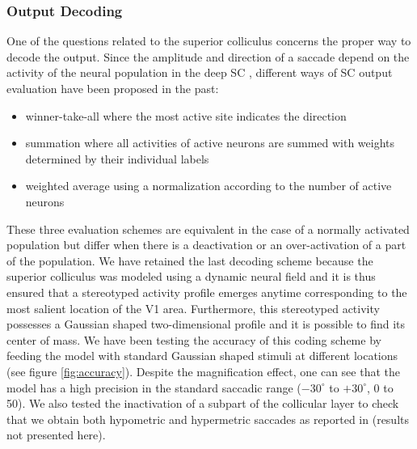 \subsubsection{Output Decoding}
One of the questions related to the superior colliculus concerns the proper way
to decode the output. Since the amplitude and direction of a saccade depend on
the activity of the neural population in the deep SC \cite {Sparks:1990},
different ways of SC output evaluation have been proposed in the past:
\begin{itemize}
\item winner-take-all where the most active site indicates the direction
\item summation\cite{McIlwain:1976,Sparks:1976} where all activities of active
  neurons are summed with weights determined by their individual labels
\item weighted average \cite{Lee:1988} using a normalization
  according to the number of active neurons
\end{itemize}
These three evaluation schemes are equivalent in the case of a
normally activated population but differ when there is a deactivation
or an over-activation of a part of the population. We have retained
the last decoding scheme because the superior colliculus was modeled
using a dynamic neural field and it is thus ensured that a stereotyped
activity profile emerges anytime corresponding to the most salient
location of the V1 area. Furthermore, this stereotyped activity
possesses a Gaussian shaped two-dimensional profile and it is possible
to find its center of mass. We have been testing the accuracy of this
coding scheme by feeding the model with standard Gaussian shaped
stimuli at different locations (see figure
\ref{fig:accuracy}). Despite the magnification effect, one can see
that the model has a high precision in the standard saccadic range
($-30^\circ$ to $+30^\circ$, 0 to 50). We also tested the inactivation
of a subpart of the collicular layer to check that we obtain both
hypometric and hypermetric saccades as reported in
\cite{Robinson:1972} (results not presented here).
